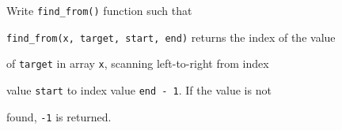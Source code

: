Write \texttt{find\_from()} function such that

\texttt{find\_from(x, target, start, end)} returns the index of the value

of \texttt{target} in array \texttt{x}, scanning left-to-right from index

value \texttt{start} to index value \texttt{end - 1}. If the value is not

found, \texttt{-1} is returned.

